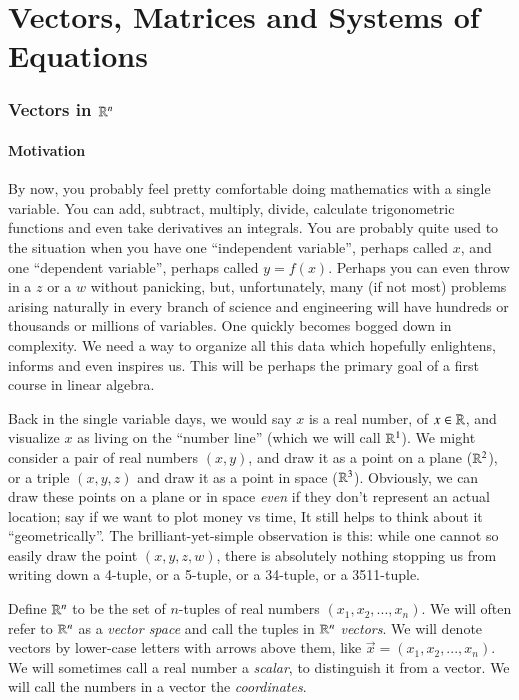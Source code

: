 \documentclass[Main.tex]{subfiles}
\begin{document}
\part{Vectors, Matrices and Systems of Equations}
\section{Vectors in $\mathbb{R}^n$}

\subsection{Motivation}

By now, you probably feel pretty comfortable doing mathematics with a single variable.
You can add, subtract, multiply, divide, calculate trigonometric functions and even take derivatives an integrals.  
You are probably quite used to the situation when you have one ``independent variable'', perhaps called $x$, and one ``dependent variable'', perhaps called $y=f(x)$.  
Perhaps you can even throw in a $z$ or a $w$ without panicking, but, unfortunately, many (if not most) problems arising naturally in every branch of science and engineering will have hundreds or thousands or millions of variables.  
One quickly becomes bogged down in complexity.
We need a way to organize all this data which hopefully enlightens, informs and even inspires us.
This will be perhaps the primary goal of a first course in linear algebra.  

Back in the single variable days, we would say $x$ is a real number, of $x\in \mathbb{R}$, and visualize $x$ as living on the ``number line'' (which we will call $\mathbb{R}^1$). 
We might consider a pair of real numbers $(x,y)$, and draw it as a point on a plane ($\mathbb{R}^2$), or a triple $(x,y,z)$ and draw it as a point in space ($\mathbb{R}^3$).  
Obviously, we can draw these points on a plane or in space \emph{even} if they don't represent an actual location; say if we want to plot money vs time, 
It still helps to think about it ``geometrically''.  
The brilliant-yet-simple observation is this:  
while one cannot so easily draw the point $(x,y,z,w)$, there is absolutely nothing stopping us from writing down a 4-tuple, or a 5-tuple, or a 34-tuple, or a 3511-tuple.

\begin{Def}
  Define $\mathbb{R}^n$ to be the set of $n$-tuples of real numbers $(x_1,x_2,...,x_n)$.  
  We will often refer to $\mathbb{R}^n$ as a \emph{vector space} and call the tuples in $\mathbb{R}^n$ \emph{vectors}.  
  We will denote vectors by lower-case letters with arrows above them, like $\vec{x}=(x_1,x_2,...,x_n)$.  
  We will sometimes call a real number a \emph{scalar}, to distinguish it from a vector.  
  We will call the numbers in a vector the \emph{coordinates}.  
\end{Def}
\end{document}
